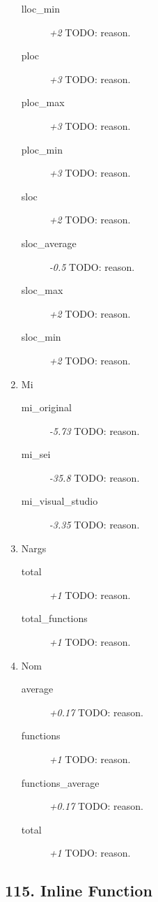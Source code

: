 \begin{enumerate}
\begin{description}
          \item [lloc\_min] \textit{+2} TODO: reason.
          \item [ploc] \textit{+3} TODO: reason.
          \item [ploc\_max] \textit{+3} TODO: reason.
          \item [ploc\_min] \textit{+3} TODO: reason.
          \item [sloc] \textit{+2} TODO: reason.
          \item [sloc\_average] \textit{-0.5} TODO: reason.
          \item [sloc\_max] \textit{+2} TODO: reason.
          \item [sloc\_min] \textit{+2} TODO: reason.
        \end{description}
  \item Mi
        \begin{description}
          \item [mi\_original] \textit{-5.73} TODO: reason.
          \item [mi\_sei] \textit{-35.8} TODO: reason.
          \item [mi\_visual\_studio] \textit{-3.35} TODO: reason.
        \end{description}
  \item Nargs
        \begin{description}
          \item [total] \textit{+1} TODO: reason.
          \item [total\_functions] \textit{+1} TODO: reason.
        \end{description}
  \item Nom
        \begin{description}
          \item [average] \textit{+0.17} TODO: reason.
          \item [functions] \textit{+1} TODO: reason.
          \item [functions\_average] \textit{+0.17} TODO: reason.
          \item [total] \textit{+1} TODO: reason.
        \end{description}
\end{enumerate}
\subsection{115. Inline Function}

